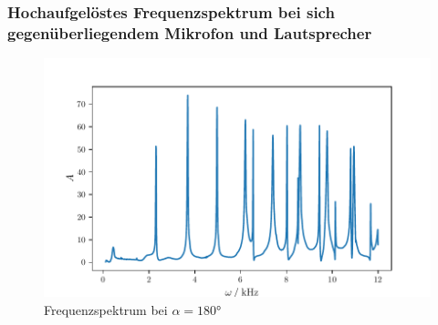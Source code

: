 \subsubsection{Hochaufgelöstes Frequenzspektrum bei sich gegenüberliegendem Mikrofon und Lautsprecher}
\begin{figure}
    \centering
    \includegraphics{build/hangle.pdf}
    \caption{Frequenzspektrum bei $\alpha = \ang{180}$}
    \label{fig:hangle}
\end{figure}
\FloatBarrier

